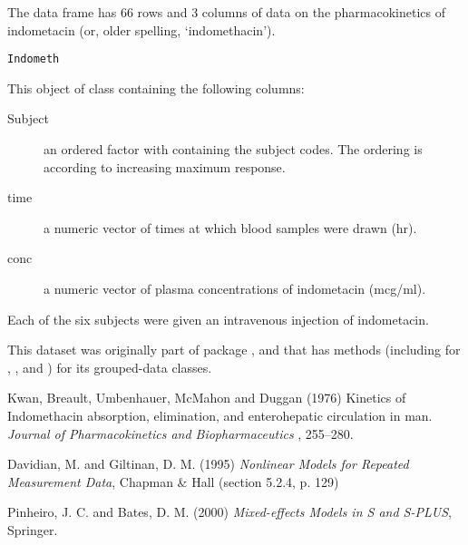 %
\begin{Examples}
\end{Examples}
%
\begin{Description}\relax
The  data frame has 66 rows and 3 columns of data on
the pharmacokinetics of indometacin (or, older spelling,
`indomethacin').
\end{Description}
%
\begin{Usage}
\begin{verbatim}
Indometh
\end{verbatim}
\end{Usage}
%
\begin{Format}
This object of class  containing the following columns:
\begin{description}

\item[Subject] 
an ordered factor with containing the subject codes.  The
ordering is according to increasing maximum response.

\item[time] 
a numeric vector of times at which blood samples were drawn (hr).

\item[conc] 
a numeric vector of plasma concentrations of indometacin (mcg/ml).


\end{description}

\end{Format}
%
\begin{Details}\relax
Each of the six subjects were given an intravenous injection of
indometacin.

This dataset was originally part of package , and that has
methods (including for \code{[}, ,  and
) for its grouped-data classes. 
\end{Details}
%
\begin{Source}\relax
Kwan, Breault, Umbenhauer, McMahon and Duggan (1976)
Kinetics of Indomethacin absorption, elimination, and
enterohepatic circulation in man.
\emph{Journal of Pharmacokinetics and Biopharmaceutics} ,
255--280.

Davidian, M. and Giltinan, D. M. (1995)
\emph{Nonlinear Models for Repeated Measurement Data},
Chapman \& Hall (section 5.2.4, p. 129)

Pinheiro, J. C. and Bates, D. M. (2000) \emph{Mixed-effects Models in
S and S-PLUS}, Springer.
\end{Source}
